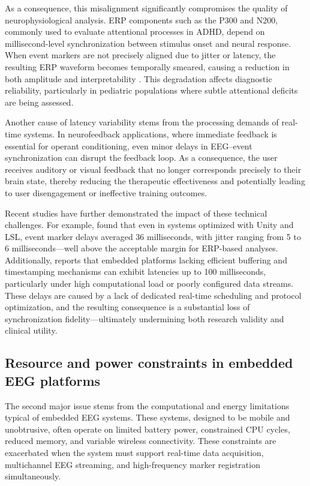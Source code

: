 As a consequence, this misalignment significantly compromises the quality of neurophysiological analysis. ERP components such as the P300 and N200, commonly used to evaluate attentional processes in ADHD, depend on millisecond-level synchronization between stimulus onset and neural response. When event markers are not precisely aligned due to jitter or latency, the resulting ERP waveform becomes temporally smeared, causing a reduction in both amplitude and interpretability \cite{iwama2022jitter}. This degradation affects diagnostic reliability, particularly in pediatric populations where subtle attentional deficits are being assessed.

Another cause of latency variability stems from the processing demands of real-time systems. In neurofeedback applications, where immediate feedback is essential for operant conditioning, even minor delays in EEG–event synchronization can disrupt the feedback loop. As a consequence, the user receives auditory or visual feedback that no longer corresponds precisely to their brain state, thereby reducing the therapeutic effectiveness and potentially leading to user disengagement or ineffective training outcomes.

Recent studies have further demonstrated the impact of these technical challenges. For example, \cite{larsen2024quantifying} found that even in systems optimized with Unity and LSL, event marker delays averaged 36 milliseconds, with jitter ranging from 5 to 6 milliseconds—well above the acceptable margin for ERP-based analyses. Additionally, \cite{brainproducts2024lsl} reports that embedded platforms lacking efficient buffering and timestamping mechanisms can exhibit latencies up to 100 milliseconds, particularly under high computational load or poorly configured data streams. These delays are caused by a lack of dedicated real-time scheduling and protocol optimization, and the resulting consequence is a substantial loss of synchronization fidelity—ultimately undermining both research validity and clinical utility.


\subsection{Resource and power constraints in embedded EEG platforms}

The second major issue stems from the computational and energy limitations typical of embedded EEG systems. These systems, designed to be mobile and unobtrusive, often operate on limited battery power, constrained CPU cycles, reduced memory, and variable wireless connectivity. These constraints are exacerbated when the system must support real-time data acquisition, multichannel EEG streaming, and high-frequency marker registration simultaneously.

